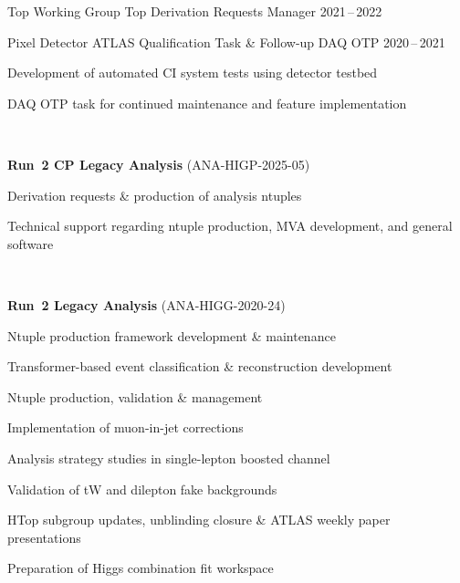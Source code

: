 \begin{cvhonors}
  \cvhonor
    {Top Working Group} %
    {Top Derivation Requests Manager} %
    {} %
    {2021\,--\,2022} %
    {}

  \cvhonor
    {Pixel Detector} %
    {ATLAS Qualification Task \& Follow-up DAQ OTP} %
    {} %
    {2020\,--\,2021} %
    {%
        \begin{cvitems}%
            \item {Development of automated CI system tests using detector testbed}
            \item {DAQ OTP task for continued maintenance and feature implementation}
        \end{cvitems}%
        ~%
    }
\end{cvhonors}


\begin{cvpubs}
    \cvpub
        {%
            \textbf{Run~2 \ttHbbtwo CP Legacy Analysis} \textmd{(ANA-HIGP-2025-05)}\newline
            \begin{cvitems}
                \item {Derivation requests \& production of analysis ntuples}
                \item {Technical support regarding ntuple production, MVA development, and general software}
            \end{cvitems}
            ~%
        }

    \cvpub
        {%
            \textbf{Run~2 \ttHbbtwo Legacy Analysis} \textmd{(ANA-HIGG-2020-24)}\newline
            \begin{cvitems}
                \item {Ntuple production framework development \& maintenance}
                \item {Transformer-based event classification \& reconstruction development}
                \item {Ntuple production, validation \& management}
                \item {Implementation of muon-in-jet corrections}
                \item {Analysis strategy studies in single-lepton boosted channel}
                \item {Validation of tW and dilepton fake backgrounds}
                \item {HTop subgroup updates, unblinding closure \& ATLAS weekly paper presentations}
                \item {Preparation of Higgs combination fit workspace}
            \end{cvitems}
            ~%
        }
\end{cvpubs}

